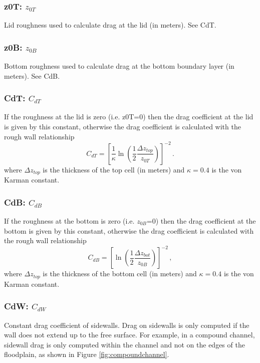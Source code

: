 \subsubsection{z0T: $z_{0T}$}

Lid roughness used to calculate drag at the lid (in meters).  See CdT.

\subsubsection{z0B: $z_{0B}$}

Bottom roughness used to calculate drag at the bottom boundary layer (in meters).  See CdB.

\subsubsection{CdT: $C_{dT}$}

If the roughness at the lid is zero (i.e. z0T=0) then the drag coefficient at the lid is given by
this constant, otherwise the drag coefficient is calculated with the rough wall 
relationship
\[
C_{dT} = \left[\frac{1}{\kappa}\ln\left(\frac{1}{2}\frac{\Delta z_{top}}{z_{0T}}\right)\right]^{-2}\,.
\]
where $\Delta z_{top}$ is the thickness of the top cell (in meters) and $\kappa=0.4$ is the von Karman constant.

\subsubsection{CdB: $C_{dB}$}

If the roughness at the bottom is zero (i.e. $z_{0B}$=0) then the drag coefficient at the bottom is given by
this constant, otherwise the drag coefficient is calculated with the rough wall
relationship
\[
C_{dB} = \left[\ln\left(\frac{1}{2}\frac{\Delta z_{bot}}{z_{0B}}\right)\right]^{-2}\,,
\]
where $\Delta z_{top}$ is the thickness of the bottom cell (in meters) and $\kappa=0.4$ is the von Karman constant.

\subsubsection{CdW: $C_{dW}$}

Constant drag coefficient of sidewalls.  Drag on sidewalls is only computed if the wall
does not extend up to the free surface.  For example, in a compound channel, sidewall
drag is only computed within the channel and not on the edges of the floodplain, as shown
in Figure \ref{fig:compoundchannel}.

